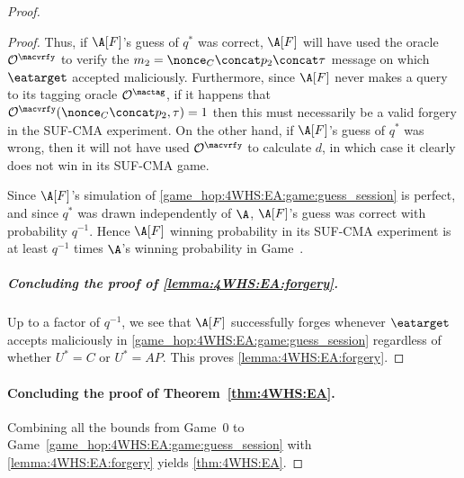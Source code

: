 \begin{proof}
\begin{proof}
Thus, 
if $\A[F]$'s guess of $q^*$ was correct,
$\A[F]$ will have used the oracle $\mathcal{O}^{\macvrfy}$ to verify the $m_2 = \nonce_{C} \concat p_2 \concat \tau$ message on which $\eatarget$ accepted maliciously.
Furthermore,
since $\A[F]$ never makes a query to its tagging oracle $\mathcal{O}^{\mactag}$,
if it happens that $\mathcal{O}^{\macvrfy}(\nonce_{C} \concat p_2, \tau) = 1$ then this must necessarily be a valid forgery in the SUF-CMA experiment.
On the other hand,
if $\A[F]$'s guess of $q^*$ was wrong,
then it will not have used $\mathcal{O}^{\macvrfy}$ to calculate $d$,
in which case it clearly does not win in its SUF-CMA game.

Since $\A[F]$'s simulation of \cref{game_hop:4WHS:EA:game:guess_session} is perfect,
and since $q^*$ was drawn independently of $\A$,
$\A[F]$'s guess was correct with probability $q^{-1}$.
Hence $\A[F]$ winning probability in its SUF-CMA experiment is at least $q^{-1}$ times  $\A$'s winning probability in Game~\game{}.
 


\subparagraph{Concluding the proof of \cref{lemma:4WHS:EA:forgery}.}

Up to a factor of $q^{-1}$,
we see that $\A[F]$ successfully forges whenever $\eatarget$ accepts maliciously in \cref{game_hop:4WHS:EA:game:guess_session} regardless of whether $U^* = C$ or $U^* = AP$.
This proves \cref{lemma:4WHS:EA:forgery}. 
\end{proof}


\paragraph{Concluding the proof of Theorem~\ref{thm:4WHS:EA}.}

Combining all the bounds from Game~0 to Game~\ref{game_hop:4WHS:EA:game:guess_session} with \cref{lemma:4WHS:EA:forgery} yields \cref{thm:4WHS:EA}.
\end{proof} %
 



